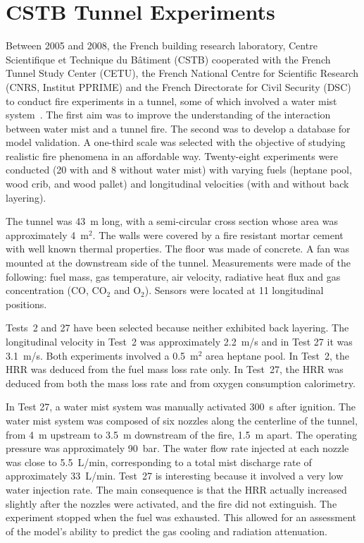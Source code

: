 \section{CSTB Tunnel Experiments}

Between 2005 and 2008, the French building research laboratory, Centre Scientifique et Technique du B\^{a}timent (CSTB) cooperated with the French Tunnel Study Center (CETU), the French National Centre for Scientific Research (CNRS, Institut PPRIME) and the French Directorate for Civil Security (DSC) to conduct fire experiments in a tunnel, some of which involved a water mist system~\cite{Meyrand,Blanchard:FT2014}. The first aim was to improve the understanding of the interaction between water mist and a tunnel fire.  The second was to develop a database for model validation. A one-third scale was selected with the objective of studying realistic fire phenomena in an affordable way.  Twenty-eight experiments were conducted (20 with and 8 without water mist) with varying fuels (heptane pool, wood crib, and wood pallet) and longitudinal velocities (with and without back layering).

The tunnel was 43~m long, with a semi-circular cross section whose area was approximately 4~m$^2$. The walls were covered by a fire resistant mortar cement with well known thermal properties. The floor was made of concrete. A fan was mounted at the downstream side of the tunnel.  Measurements were made of the following: fuel mass, gas temperature, air velocity, radiative heat flux and gas concentration (CO, CO$_2$ and O$_2$).  Sensors were located at 11 longitudinal positions.

Tests~2 and 27 have been selected because neither exhibited back layering. The longitudinal velocity in Test~2 was approximately 2.2~m/s and in Test 27 it was 3.1~m/s. Both experiments involved a 0.5~m$^2$ area heptane pool. In Test~2, the HRR was deduced from the fuel mass loss rate only.  In Test~27, the HRR was deduced from both the mass loss rate and from oxygen consumption calorimetry.

In Test 27, a water mist system was manually activated 300~s after ignition. The water mist system was composed of six nozzles along the centerline of the tunnel, from 4~m upstream to 3.5~m downstream of the fire, 1.5~m apart.  The operating pressure was approximately 90~bar. The water flow rate injected at each nozzle was close to 5.5~L/min, corresponding to a total mist discharge rate of approximately 33~L/min.  Test~27 is interesting because it involved a very low water injection rate.  The main consequence is that the HRR actually increased slightly after the nozzles were activated, and the fire did not extinguish.  The experiment stopped when the fuel was exhausted. This allowed for an assessment of the model's ability to predict the gas cooling and radiation attenuation.

